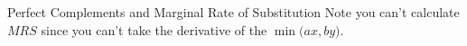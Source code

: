 \documentclass[12pt,t]{beamer}
\begin{document}
\begin{frame}{Perfect Complements and Marginal Rate of Substitution}
  Note you can't calculate $MRS$ since you can't take the derivative of the $\min\big(ax, by\big)$.
\end{frame}
\end{document}
